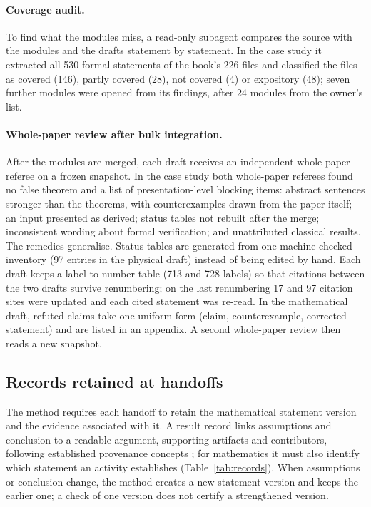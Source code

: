 \documentclass[11pt]{article}
\begin{document}
\paragraph{Coverage audit.} To find what the modules miss, a read-only
subagent compares the source with the modules and the drafts statement by
statement. In the case study it extracted all 530 formal statements of the
book's 226 files and classified the files as covered (146), partly covered
(28), not covered (4) or expository (48); seven further modules were opened
from its findings, after 24 modules from the owner's list.

\paragraph{Whole-paper review after bulk integration.} After the modules are
merged, each draft receives an independent whole-paper referee on a frozen
snapshot. In the case study both whole-paper referees found no false theorem
and a list of presentation-level blocking items: abstract sentences stronger
than the theorems, with counterexamples drawn from the paper itself; an input
presented as derived; status tables not rebuilt after the merge; inconsistent
wording about formal verification; and unattributed classical results. The
remedies generalise. Status tables are generated from one machine-checked
inventory (97 entries in the physical draft) instead of being edited by hand.
Each draft keeps a label-to-number table (713 and 728 labels) so that
citations between the two drafts survive renumbering; on the last
renumbering 17 and 97 citation sites were updated and each cited statement was
re-read. In the mathematical draft, refuted claims take one uniform form
(claim, counterexample, corrected statement) and are listed in an appendix. A second whole-paper
review then reads a new snapshot.

\subsection{Records retained at handoffs}
\label{sec:records}
The method requires each handoff to retain the mathematical statement version
and the evidence associated with it. A result record links assumptions and
conclusion to a readable argument, supporting artifacts and contributors,
following established provenance concepts \citep{prov}; for mathematics it
must also identify which statement an activity establishes
(Table~\ref{tab:records}). When assumptions or conclusion change, the method
creates a new statement version and keeps the earlier one; a check of one
version does not certify a strengthened version.
\end{document}
